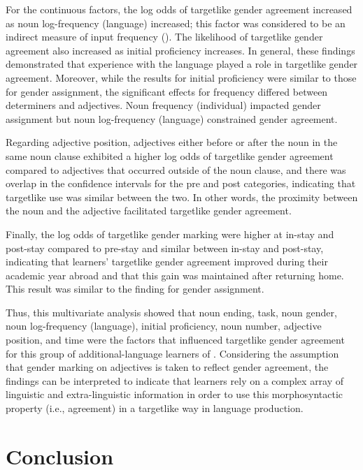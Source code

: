 \documentclass[output=paper,colorlinks,citecolor=brown,modfonts,nonflat]{../langscibook}
\begin{document}
 For the continuous factors, the log odds of targetlike gender agreement increased as noun log-frequency (language) increased; this factor was considered to be an indirect measure of input frequency (\citealt{GudmestadEtAl2019}). The likelihood of targetlike gender agreement also increased as initial proficiency increases. In general, these findings demonstrated that experience with the language played a role in targetlike gender agreement. Moreover, while the results for initial proficiency were similar to those for gender assignment, the significant effects for frequency differed between determiners and adjectives. Noun frequency (individual) impacted gender assignment but noun log-frequency (language) constrained gender agreement.



Regarding adjective position, adjectives either before or after the noun in the same noun clause exhibited a higher log odds of targetlike gender agreement compared to adjectives that occurred outside of the noun clause, and there was overlap in the confidence intervals for the pre and post categories, indicating that targetlike use was similar between the two. In other words, the proximity between the noun and the adjective facilitated targetlike gender agreement.



Finally, the log odds of targetlike gender marking were higher at in-stay and post-stay compared to pre-stay and similar between in-stay and post-stay, indicating that learners’ targetlike gender agreement improved during their academic year abroad and that this gain was maintained after returning home. This result was similar to the finding for gender assignment.



Thus, this multivariate analysis showed that noun ending, task, noun gender, noun log-frequency (language), initial proficiency, noun number, adjective position, and time were the factors that influenced targetlike gender agreement for this group of additional-language learners of . Considering the assumption that gender marking on adjectives is taken to reflect gender agreement, the findings can be interpreted to indicate that learners rely on a complex array of linguistic and extra-linguistic information in order to use this morphosyntactic property (i.e., agreement) in a targetlike way in language production.

\section{Conclusion}\label{sec:gudmestad:4}
\end{document}
